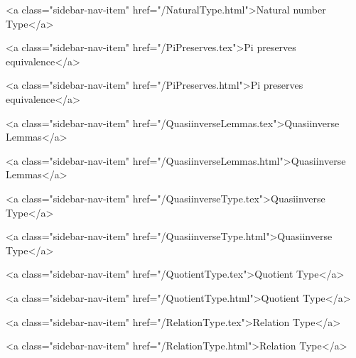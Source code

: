       
        
          <a class="sidebar-nav-item" href="/NaturalType.html">Natural number Type</a>
        
      
    
      
        
          <a class="sidebar-nav-item" href="/PiPreserves.tex">Pi preserves equivalence</a>
        
      
    
      
        
          <a class="sidebar-nav-item" href="/PiPreserves.html">Pi preserves equivalence</a>
        
      
    
      
        
          <a class="sidebar-nav-item" href="/QuasiinverseLemmas.tex">Quasiinverse Lemmas</a>
        
      
    
      
        
          <a class="sidebar-nav-item" href="/QuasiinverseLemmas.html">Quasiinverse Lemmas</a>
        
      
    
      
        
          <a class="sidebar-nav-item" href="/QuasiinverseType.tex">Quasiinverse Type</a>
        
      
    
      
        
          <a class="sidebar-nav-item" href="/QuasiinverseType.html">Quasiinverse Type</a>
        
      
    
      
        
          <a class="sidebar-nav-item" href="/QuotientType.tex">Quotient Type</a>
        
      
    
      
        
          <a class="sidebar-nav-item" href="/QuotientType.html">Quotient Type</a>
        
      
    
      
        
          <a class="sidebar-nav-item" href="/RelationType.tex">Relation Type</a>
        
      
    
      
        
          <a class="sidebar-nav-item" href="/RelationType.html">Relation Type</a>
        
